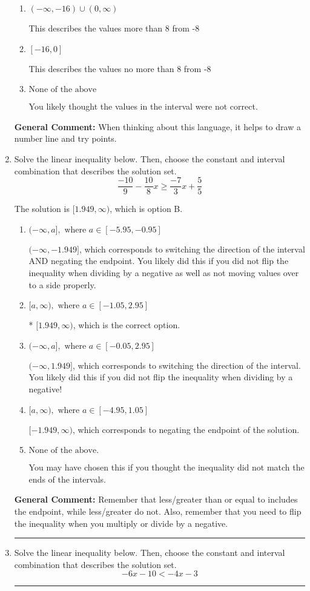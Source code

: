 \documentclass{extbook}[14pt]
\newcommand{\litem}[1]{\item #1

\rule{\textwidth}{0.4pt}}
\begin{document}
\begin{enumerate}
{\begin{enumerate}[label=\Alph*.]
This describes the values less than 8 from -8
\item \( (-\infty, -16) \cup (0, \infty) \)

This describes the values more than 8 from -8
\item \( [-16, 0] \)

This describes the values no more than 8 from -8
\item \( \text{None of the above} \)

You likely thought the values in the interval were not correct.
\end{enumerate}

\textbf{General Comment:} When thinking about this language, it helps to draw a number line and try points.
}
\litem{
Solve the linear inequality below. Then, choose the constant and interval combination that describes the solution set.
\[ \frac{-10}{9} - \frac{10}{8} x \geq \frac{-7}{3} x + \frac{5}{5} \]

The solution is \( [1.949, \infty) \), which is option B.\begin{enumerate}[label=\Alph*.]
\item \( (-\infty, a], \text{ where } a \in [-5.95, -0.95] \)

 $(-\infty, -1.949]$, which corresponds to switching the direction of the interval AND negating the endpoint. You likely did this if you did not flip the inequality when dividing by a negative as well as not moving values over to a side properly.
\item \( [a, \infty), \text{ where } a \in [-1.05, 2.95] \)

* $[1.949, \infty)$, which is the correct option.
\item \( (-\infty, a], \text{ where } a \in [-0.05, 2.95] \)

 $(-\infty, 1.949]$, which corresponds to switching the direction of the interval. You likely did this if you did not flip the inequality when dividing by a negative!
\item \( [a, \infty), \text{ where } a \in [-4.95, 1.05] \)

 $[-1.949, \infty)$, which corresponds to negating the endpoint of the solution.
\item \( \text{None of the above}. \)

You may have chosen this if you thought the inequality did not match the ends of the intervals.
\end{enumerate}

\textbf{General Comment:} Remember that less/greater than or equal to includes the endpoint, while less/greater do not. Also, remember that you need to flip the inequality when you multiply or divide by a negative.
}
\litem{
Solve the linear inequality below. Then, choose the constant and interval combination that describes the solution set.
\[ -6x -10 < -4x -3 \]

}
\end{enumerate}
\end{document}
